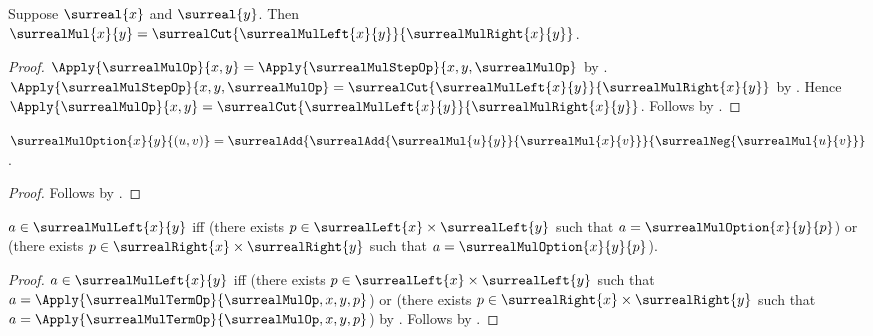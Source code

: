 \begin{theorem}\label{surreal_mul_equation}
    Suppose $\surreal{x}$ and $\surreal{y}$.
    Then $\surrealMul{x}{y}=
        \surrealCut{\surrealMulLeft{x}{y}}{\surrealMulRight{x}{y}}$.
\end{theorem}
\begin{proof}
    $\Apply{\surrealMulOp}{x,y}
        =\Apply{\surrealMulStepOp}
            {x,y,\surrealMulOp}$
        by
        .
    $\Apply{\surrealMulStepOp}{x,y,\surrealMulOp}
        =\surrealCut{\surrealMulLeft{x}{y}}{\surrealMulRight{x}{y}}$
        by .
    Hence $\Apply{\surrealMulOp}{x,y}
        =\surrealCut{\surrealMulLeft{x}{y}}{\surrealMulRight{x}{y}}$.
    Follows by .
\end{proof}

\begin{proposition}\label{surreal_mul_option_pair}
    $\surrealMulOption{x}{y}{(u,v)}=
        \surrealAdd
            {\surrealAdd{\surrealMul{u}{y}}{\surrealMul{x}{v}}}
            {\surrealNeg{\surrealMul{u}{v}}}$.
\end{proposition}
\begin{proof}
    Follows by
        .
\end{proof}

\begin{proposition}\label{surreal_mul_left_iff}
    $a\in\surrealMulLeft{x}{y}$ iff
        (there exists $p\in\surrealLeft{x}\times\surrealLeft{y}$
            such that $a=\surrealMulOption{x}{y}{p}$) or
        (there exists $p\in\surrealRight{x}\times\surrealRight{y}$
            such that $a=\surrealMulOption{x}{y}{p}$).
\end{proposition}
\begin{proof}
    $a\in\surrealMulLeft{x}{y}$ iff
        (there exists $p\in\surrealLeft{x}\times\surrealLeft{y}$
            such that
            $a=\Apply{\surrealMulTermOp}{\surrealMulOp,x,y,p}$) or
        (there exists $p\in\surrealRight{x}\times\surrealRight{y}$
            such that
            $a=\Apply{\surrealMulTermOp}{\surrealMulOp,x,y,p}$)
        by .
    Follows by .
\end{proof}

